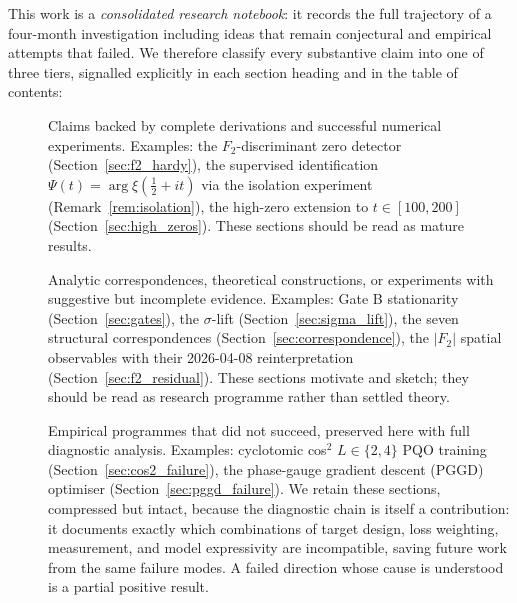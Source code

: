 \documentclass[11pt, a4paper]{article}
\theoremstyle{definition}
\theoremstyle{plain}
\newcommand{\xif}{\xi}                      %
\newcommand{\Psip}{\Psi}                    %
\begin{document}
\noindent This work is a \emph{consolidated research notebook}: it
records the full trajectory of a four-month investigation including
ideas that remain conjectural and empirical attempts that failed. We
therefore classify every substantive claim into one of three tiers,
signalled explicitly in each section heading and in the table of
contents:

\begin{description}
  \item[\textbf{\textcolor{ForestGreen}{\rule{0.9ex}{0.9ex}}\ \
        Tier 1 — Validated.}]
        Claims backed by complete derivations and successful numerical
        experiments. Examples: the $F_2$-discriminant zero detector
        (Section~\ref{sec:f2_hardy}), the supervised identification
        $\Psip(t) = \arg\xif(\tfrac{1}{2}+it)$ via the isolation
        experiment (Remark~\ref{rem:isolation}), the high-zero
        extension to $t\in[100,200]$ (Section~\ref{sec:high_zeros}).
        These sections should be read as mature results.

  \item[\textbf{\textcolor{orange}{\rule{0.9ex}{0.9ex}}\ \
        Tier 2 — Ideas and partial results.}]
        Analytic correspondences, theoretical constructions, or
        experiments with suggestive but incomplete evidence.
        Examples: Gate B stationarity (Section~\ref{sec:gates}), the
        $\sigma$-lift (Section~\ref{sec:sigma_lift}), the seven
        structural correspondences (Section~\ref{sec:correspondence}),
        the $|F_2|$ spatial observables with their 2026-04-08
        reinterpretation (Section~\ref{sec:f2_residual}). These
        sections motivate and sketch; they should be read as research
        programme rather than settled theory.

  \item[\textbf{\textcolor{red}{\rule{0.9ex}{0.9ex}}\ \
        Tier 3 — Failed attempts and their diagnoses.}]
        Empirical programmes that did not succeed, preserved here with
        full diagnostic analysis. Examples: cyclotomic cos$^2$
        $L\in\{2,4\}$ PQO training
        (Section~\ref{sec:cos2_failure}), the phase-gauge gradient
        descent (PGGD) optimiser
        (Section~\ref{sec:pggd_failure}). We retain these sections,
        compressed but intact, because the diagnostic chain is itself
        a contribution: it documents exactly which combinations of
        target design, loss weighting, measurement, and model
        expressivity are incompatible, saving future work from the
        same failure modes. A failed direction whose cause is
        understood is a partial positive result.
\end{description}
\end{document}
